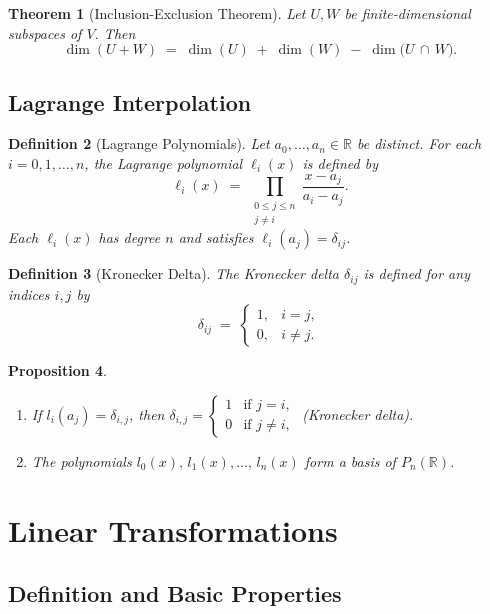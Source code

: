 \documentclass[12pt]{article}
\theoremstyle{break}             %
\newtheorem{thm}{Theorem}          %
\newtheorem{prop}[thm]{Proposition}%
\newtheorem{defn}[thm]{Definition}
\begin{document}
\begin{thm}[Inclusion-Exclusion Theorem]
Let \(U,W\) be finite-dimensional subspaces of \(V\). Then
\[
\dim(U + W) \;=\; \dim(U)\;+\;\dim(W)\;-\;\dim\bigl(U \,\cap\, W\bigr).
\]
\end{thm}

\subsection{Lagrange Interpolation}

\begin{defn}[Lagrange Polynomials]
Let $a_0,\dots,a_n\in\mathbb{R}$ be distinct.  For each $i=0,1,\dots,n$, the \emph{Lagrange polynomial} $\ell_i(x)$ is defined by
\[
\ell_i(x)\;=\;\prod_{\substack{0\le j\le n\\j\neq i}}
\frac{x - a_j}{a_i - a_j}.
\]
Each $\ell_i(x)$ has degree $n$ and satisfies $\ell_i(a_j)=\delta_{ij}$.
\end{defn}

\begin{defn}[Kronecker Delta]
The \emph{Kronecker delta} $\delta_{ij}$ is defined for any indices $i,j$ by
\[
\delta_{ij}\;=\;
\begin{cases}
1,&i=j,\\
0,&i\neq j.
\end{cases}
\]
\end{defn}

\begin{prop}\leavevmode\vspace{-20.5pt}
\begin{enumerate}
\item If \(l_i(a_j) = \delta_{i,j}\), then \(\delta_{i,j} = 
\begin{cases}
1 & \text{if } j = i,\\
0 & \text{if } j \neq i,
\end{cases}\) (Kronecker delta).
\item The polynomials \(l_0(x),\,l_1(x),\dots,\,l_n(x)\) form a basis of \(P_n(\mathbb{R})\).
\end{enumerate}
\end{prop}

\section{Linear Transformations}

\subsection{Definition and Basic Properties}
\end{document}
